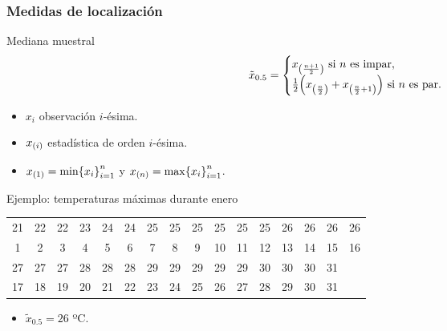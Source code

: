 \documentclass[table]{beamer}
\begin{document}
\begin{frame}
    \frametitle{Medidas de localización}
    \begin{block}{Mediana muestral}
        \begin{equation*}
            \tilde{x}_{0.5} =
            \begin{cases}
                x_{\parens{\frac{n + 1}{2}}} \text{ si } n \text{ es impar} , \\
                \frac{1}{2} \parens{x_{\parens{\frac{n}{2}}} + x_{\parens{\frac{n}{2} + 1}}} \text{ si } n \text{ es par} .
            \end{cases}
        \end{equation*}
        \begin{itemize}
            \item $x_{i}$ observación $i$-ésima.
            \item $x_{\parens{i}}$ estadística de orden $i$-ésima.
            \item $x_{\parens{1}} = \min \bparens{x_{i}}_{i = 1}^{n}$ y $x_{\parens{n}} = \max \bparens{x_{i}}_{i = 1}^{n}$.
        \end{itemize}
    \end{block}
    \begin{exampleblock}{Ejemplo: temperaturas máximas durante enero}
            \begin{center}
                \footnotesize
                \begin{tabular}{cccccccccccccccc}
                    21 & 22 & 22 & 23 & 24 & 24 & 25 & 25 & 25 & 25 & 25 & 25 & 26 & 26 & 26 & 26 \\
                    1 & 2 & 3 & 4 & 5 & 6 & 7 & 8 & 9 & 10 & 11 & 12 & 13 & 14 & 15 & 16 \\
                    \hline
                    27 & 27 & 27 & 28 & 28 & 28 & 29 & 29 & 29 & 29 & 29 & 30 & 30 & 30 & 31 & \\
                    17 & 18 & 19 & 20 & 21 & 22 & 23 & 24 & 25 & 26 & 27 & 28 & 29 & 30 & 31 & \\
                \end{tabular}
            \end{center}
        \begin{itemize}
            \item $\tilde{x}_{0.5} = 26$ ºC.
        \end{itemize}
    \end{exampleblock}
\end{frame}
\end{document}

